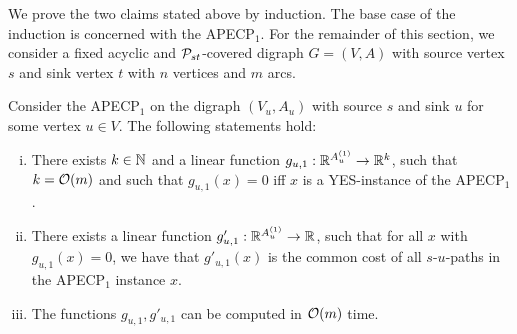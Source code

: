 We prove the two claims stated above  by induction. The base case of the induction is concerned with the APECP$_1$. For the remainder of this section, we consider a fixed acyclic and  $\mathcal{P}_{st}$-covered digraph $G = (V, A)$ with source vertex $s$ and sink vertex $t$ with $n$ vertices and $m$ arcs.

\begin{lemma}
\label{lemma:subspaces-apec-1}
     Consider the APECP$_1$ on the digraph $(V_u, A_u)$ with source $s$ and sink $u$  for some vertex $u\in V$. The following statements  hold:
    \begin{enumerate}[(i)]
        \item There exists $k \in \mathbb{N}$ and a linear function $g_{u,1} : \mathbb{R}^{A_u^{(1)}} \rightarrow \mathbb{R}^k$, such that $k = \mathcal{O}(m)$ and such that $g_{u,1}(x) = 0$ iff $x$ is a YES-instance of the APECP$_1$.
        \item There exists a linear function $g'_{u,1} : \mathbb{R}^{A_u^{(1)}} \rightarrow \mathbb{R}$, such that for all $x$ with $g_{u,1}(x) = 0$, we have that $g'_{u,1}(x)$ is the common cost of all $s$-$u$-paths in the APECP$_1$ instance $x$.
        \item  The functions $g_{u,1}, g'_{u,1}$ can be computed in $\mathcal{O}(m)$  time.
    \end{enumerate}
\end{lemma}
